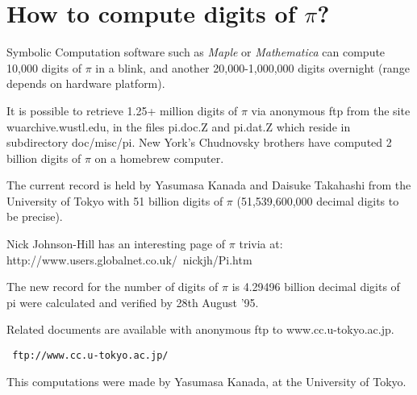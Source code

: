 \section{How to compute digits of $\pi$?}


    Symbolic Computation software such as {\it Maple} or {\it Mathematica}
    can compute 10,000 digits of $\pi$ in a blink,
    and another 20,000-1,000,000 digits overnight (range depends
    on hardware platform).

    It is possible to retrieve 1.25+ million digits of $\pi$ via anonymous
    ftp from the site wuarchive.wustl.edu, in the files pi.doc.Z and
    pi.dat.Z which reside in subdirectory doc/misc/pi.
    New York's Chudnovsky brothers have computed 2 billion digits of $\pi$
    on a homebrew computer.

The current record is held by Yasumasa Kanada and Daisuke Takahashi 
from the University of Tokyo
with 51 billion digits of $\pi$ (51,539,600,000 decimal
digits to be precise).

Nick Johnson-Hill has an interesting page of $\pi$ 
trivia at: http://www.users.globalnet.co.uk/~nickjh/Pi.htm


%
%
%
%


%
The new record for the number of digits of $\pi$ is 4.29496 billion
decimal digits of pi were calculated and verified by 28th August '95.

 Related documents are available with anonymous ftp to www.cc.u-tokyo.ac.jp.
\begin{verbatim}
 ftp://www.cc.u-tokyo.ac.jp/
\end{verbatim}

This computations were made by Yasumasa Kanada, at the University of Tokyo.



